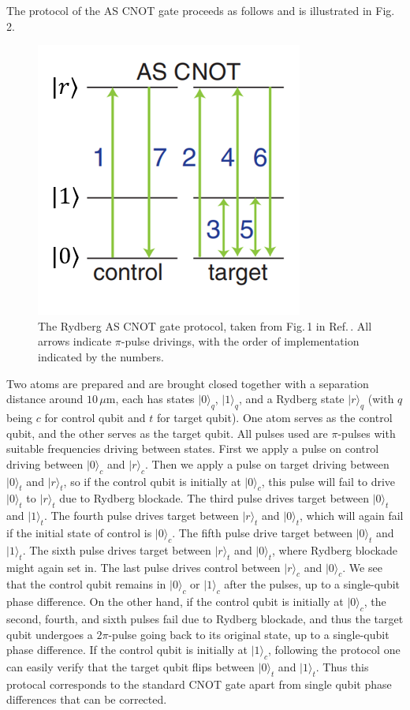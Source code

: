 \documentclass[reprint, amsmath, amssymb, aps]{revtex4-2}
\begin{document}
The protocol of the AS CNOT gate proceeds as follows and is illustrated in Fig.\,2. 
\begin{figure}
\includegraphics[scale=0.5]{F6}
\caption{The Rydberg AS CNOT gate protocol, taken from Fig.\,1 in Ref.\,\cite{Isenhower}. All arrows indicate $\pi$-pulse drivings, with the order of implementation indicated by the numbers.}
\end{figure}
Two atoms are prepared and are brought closed together with a separation distance around $10\,\mu$m, each has states $|0\rangle_q$, $|1\rangle_q$, and a Rydberg state $|r\rangle_q$ (with $q$ being $c$ for control qubit and $t$ for target qubit). One atom serves as the control qubit, and the other serves as the target qubit. All pulses used are $\pi$-pulses with suitable frequencies driving between states. First we apply a pulse on control driving between $|0\rangle_c$ and $|r\rangle_c$. Then we apply a pulse on target driving between $|0\rangle_t$ and $|r\rangle_t$, so if the control qubit is initially at $|0\rangle_c$, this pulse will fail to drive $|0\rangle_t$ to $|r\rangle_t$ due to Rydberg blockade. The third pulse drives target between $|0\rangle_t$ and $|1\rangle_t$. The fourth pulse drives target between $|r\rangle_t$ and $|0\rangle_t$, which will again fail if the initial state of control is $|0\rangle_c$. The fifth pulse drive target between $|0\rangle_t$ and $|1\rangle_t$. The sixth pulse drives target between $|r\rangle_t$ and $|0\rangle_t$, where Rydberg blockade might again set in. The last pulse drives control between $|r\rangle_c$ and $|0\rangle_c$. We see that the control qubit remains in $|0\rangle_c$ or $|1\rangle_c$ after the pulses, up to a single-qubit phase difference. On the other hand, if the control qubit is initially at $|0\rangle_c$, the second, fourth, and sixth pulses fail due to Rydberg blockade, and thus the target qubit undergoes a $2\pi$-pulse going back to its original state, up to a single-qubit phase difference. If the control qubit is initially at $|1\rangle_c$, following the protocol one can easily verify that the target qubit flips between $|0\rangle_t$ and $|1\rangle_t$. Thus this protocal corresponds to the standard CNOT gate apart from single qubit phase differences that can be corrected.\\
\end{document}
